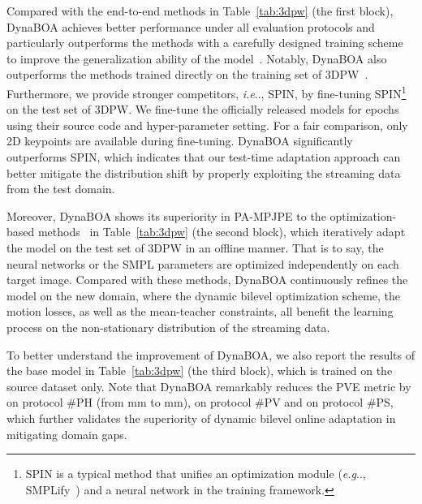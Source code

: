 \documentclass[10pt,journal,compsoc]{IEEEtran}
\makeatletter
\DeclareRobustCommand\onedot{\futurelet\@let@token\@onedot}
\def\@onedot{\ifx\@let@token.\else.\null\fi\xspace}
\def\eg{\emph{e.g}\onedot} \def\Eg{\emph{E.g}\onedot}
\def\ie{\emph{i.e}\onedot} \def\Ie{\emph{I.e}\onedot}
\newcommand{\tab}[1]{Table~\ref{#1}}
\makeatother
\begin{document}
Compared with the end-to-end methods in \tab{tab:3dpw} (the first block), DynaBOA achieves better performance under all evaluation protocols and particularly outperforms the methods with a carefully designed training scheme to improve the generalization ability of the model~\cite{DBLP:conf/nips/DoerschZ19,sun2019human,zhang2020learning}. 
Notably, DynaBOA also outperforms the methods trained directly on the training set of 3DPW~\cite{kocabas2020vibe,sun2020monocular,lin2021end,lin2021-mesh-graphormer,kocabas2021pare}. 
Furthermore, we provide stronger competitors, \ie, SPIN, by fine-tuning SPIN\footnote{SPIN is a typical method that unifies an optimization module (\eg, SMPLify~\cite{bogo2016keep}) and a neural network in the training framework.} on the test set of 3DPW. We fine-tune the officially released models for  epochs using their source code and hyper-parameter setting. For a fair comparison, only 2D keypoints are available during fine-tuning.
DynaBOA significantly outperforms SPIN, which indicates that our test-time adaptation approach can better mitigate the distribution shift by properly exploiting the streaming data from the test domain. 





Moreover, DynaBOA shows its superiority in PA-MPJPE to the optimization-based methods~\cite{bogo2016keep,arnab2019exploiting,zhang2020inference,song2020human,joo2020eft} in \tab{tab:3dpw} (the second block), which iteratively adapt the model on the test set of 3DPW in an offline manner. 
That is to say, the neural networks or the SMPL parameters are optimized independently on each target image.
Compared with these methods, DynaBOA continuously refines the model on the new domain, where the dynamic bilevel optimization scheme, the motion losses, as well as the mean-teacher constraints, all benefit the learning process on the non-stationary distribution of the streaming data. 



To better understand the improvement of DynaBOA, we also report the results of the base model  in \tab{tab:3dpw} (the third block), which is trained on the source dataset only. Note that DynaBOA remarkably reduces the PVE metric by  on protocol \#PH (from mm to mm),  on protocol \#PV and  on protocol \#PS, which further validates the superiority of dynamic bilevel online adaptation in mitigating domain gaps.
\end{document}
